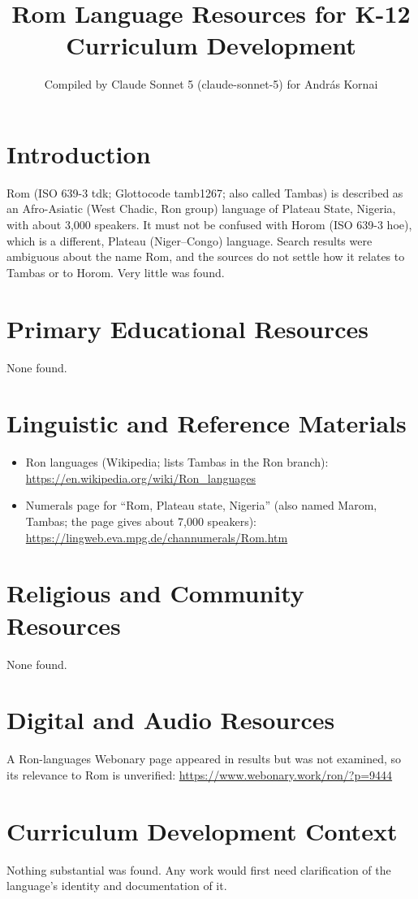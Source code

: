 \documentclass[12pt]{article}
\title{Rom Language Resources for K-12 Curriculum Development}
\author{Compiled by Claude Sonnet 5 (claude-sonnet-5) for Andr\'as Kornai}
\date{}
\begin{document}
\maketitle
\section{Introduction}
Rom (ISO 639-3 tdk; Glottocode tamb1267; also called Tambas) is described as an Afro-Asiatic (West Chadic, Ron group) language of Plateau State, Nigeria, with about 3,000 speakers. It must not be confused with Horom (ISO 639-3 hoe), which is a different, Plateau (Niger--Congo) language. Search results were ambiguous about the name Rom, and the sources do not settle how it relates to Tambas or to Horom. Very little was found.
\section{Primary Educational Resources}
None found.
\section{Linguistic and Reference Materials}
\begin{itemize}
\item Ron languages (Wikipedia; lists Tambas in the Ron branch): \url{https://en.wikipedia.org/wiki/Ron_languages}
\item Numerals page for ``Rom, Plateau state, Nigeria'' (also named Marom, Tambas; the page gives about 7,000 speakers): \url{https://lingweb.eva.mpg.de/channumerals/Rom.htm}
\end{itemize}
\section{Religious and Community Resources}
None found.
\section{Digital and Audio Resources}
A Ron-languages Webonary page appeared in results but was not examined, so its relevance to Rom is unverified: \url{https://www.webonary.work/ron/?p=9444}
\section{Curriculum Development Context}
Nothing substantial was found. Any work would first need clarification of the language's identity and documentation of it.
\end{document}
